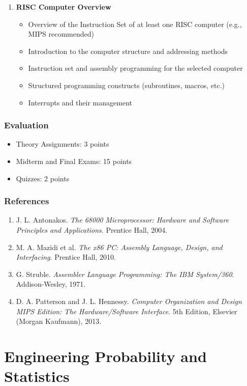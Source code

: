 \documentclass[12pt]{article}
\begin{document}
\begin{enumerate}
    \item \textbf{RISC Computer Overview}
    \begin{itemize}
        \item Overview of the Instruction Set of at least one RISC computer (e.g., MIPS recommended)
        \item Introduction to the computer structure and addressing methods
        \item Instruction set and assembly programming for the selected computer
        \item Structured programming constructs (subroutines, macros, etc.)
        \item Interrupts and their management
    \end{itemize}
\end{enumerate}

\subsubsection*{Evaluation}
\begin{itemize}
    \item Theory Assignments: 3 points
    \item Midterm and Final Exams: 15 points
    \item Quizzes: 2 points
\end{itemize}

\subsubsection*{References}
\begin{enumerate}
    \item J. L. Antonakos. \textit{The 68000 Microprocessor: Hardware and Software Principles and Applications}. Prentice Hall, 2004.
    \item M. A. Mazidi et al. \textit{The x86 PC: Assembly Language, Design, and Interfacing}. Prentice Hall, 2010.
    \item G. Struble. \textit{Assembler Language Programming: The IBM System/360}. Addison-Wesley, 1971.
    \item D. A. Patterson and J. L. Hennessy. \textit{Computer Organization and Design MIPS Edition: The Hardware/Software Interface}. 5th Edition, Elsevier (Morgan Kaufmann), 2013.
\end{enumerate}

\newpage

\section{Engineering Probability and Statistics}
\end{document}

